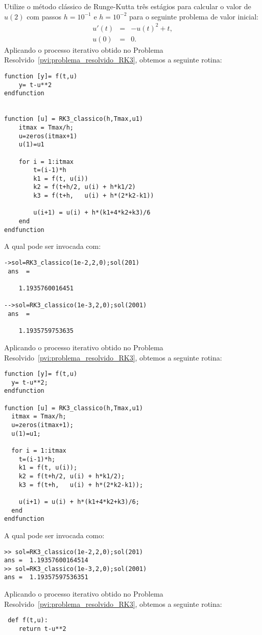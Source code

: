 \begin{exeresol} Utilize o método clássico de Runge-Kutta três estágios para calcular o valor de $u(2)$ com passos $h=10^{-1}$ e $h=10^{-2}$ para o seguinte problema de valor inicial:
\begin{eqnarray*}
 u'(t)&=& -u(t)^2 + t,\\
 u(0) &=&0.
\end{eqnarray*}
\ifisscilab
Aplicando o processo iterativo obtido no Problema Resolvido~\ref{pvi:problema_resolvido_RK3}, obtemos a seguinte rotina:
\begin{verbatim}
function [y]= f(t,u)
    y= t-u**2
endfunction


function [u] = RK3_classico(h,Tmax,u1)
    itmax = Tmax/h;
    u=zeros(itmax+1)
    u(1)=u1

    for i = 1:itmax
        t=(i-1)*h
        k1 = f(t, u(i))
        k2 = f(t+h/2, u(i) + h*k1/2)
        k3 = f(t+h,   u(i) + h*(2*k2-k1))

        u(i+1) = u(i) + h*(k1+4*k2+k3)/6
    end
endfunction
 \end{verbatim}
A qual pode ser invocada com:
\begin{verbatim}
->sol=RK3_classico(1e-2,2,0);sol(201)
 ans  =
 
    1.1935760016451  
 
-->sol=RK3_classico(1e-3,2,0);sol(2001)
 ans  =
 
    1.1935759753635 
\end{verbatim}

 
\fi
\ifisoctave
Aplicando o processo iterativo obtido no Problema Resolvido~\ref{pvi:problema_resolvido_RK3}, obtemos a seguinte rotina:
\begin{verbatim}
function [y]= f(t,u)
  y= t-u**2;
endfunction

function [u] = RK3_classico(h,Tmax,u1)
  itmax = Tmax/h;
  u=zeros(itmax+1);
  u(1)=u1;

  for i = 1:itmax
    t=(i-1)*h;
    k1 = f(t, u(i));
    k2 = f(t+h/2, u(i) + h*k1/2);
    k3 = f(t+h,   u(i) + h*(2*k2-k1));

    u(i+1) = u(i) + h*(k1+4*k2+k3)/6;
  end
endfunction
 \end{verbatim}
A qual pode ser invocada como:
\begin{verbatim}
>> sol=RK3_classico(1e-2,2,0);sol(201)
ans =  1.19357600164514
>> sol=RK3_classico(1e-3,2,0);sol(2001)
ans =  1.19357597536351 
\end{verbatim}
\fi

\ifispython
Aplicando o processo iterativo obtido no Problema Resolvido~\ref{pvi:problema_resolvido_RK3}, obtemos a seguinte rotina:
\begin{verbatim}
 def f(t,u):
	return t-u**2



\end{verbatim}
\end{exeresol}
